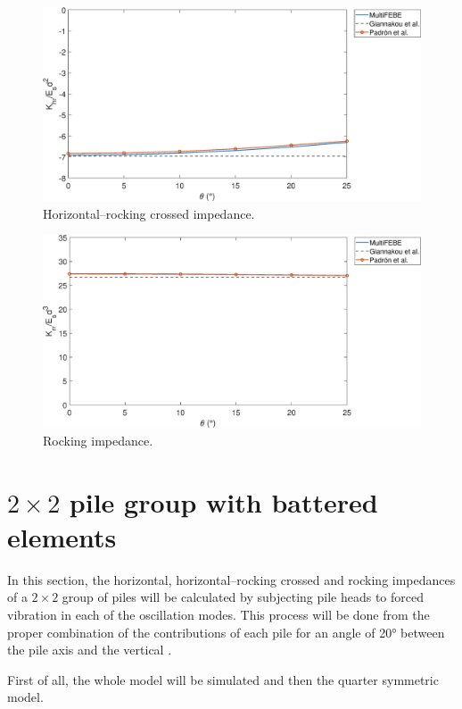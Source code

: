 \documentclass[a4]{article}
\begin{document}
\begin{figure}[tbh!]
	\centering
	\includegraphics[scale=0.5]{khr.eps}
	\caption{Horizontal–rocking crossed impedance.}
	\label{fig:khr}
\end{figure}

\begin{figure}[tbh!]
	\centering
	\includegraphics[scale=0.5]{krr.eps}
	\caption{Rocking impedance.}
	\label{fig:krr}
\end{figure}

\section{$2 \times 2 $ pile group with battered elements}

In this section, the horizontal, horizontal–rocking crossed and rocking impedances of a $2 \times 2 $ group of piles will be calculated by subjecting pile heads to forced vibration in each of the oscillation modes. This process will be done from the proper combination of the contributions of each pile for an angle of 20° between the pile axis and the vertical \cite{padron}.

First of all, the whole model will be simulated and then the quarter symmetric model.
\end{document}
